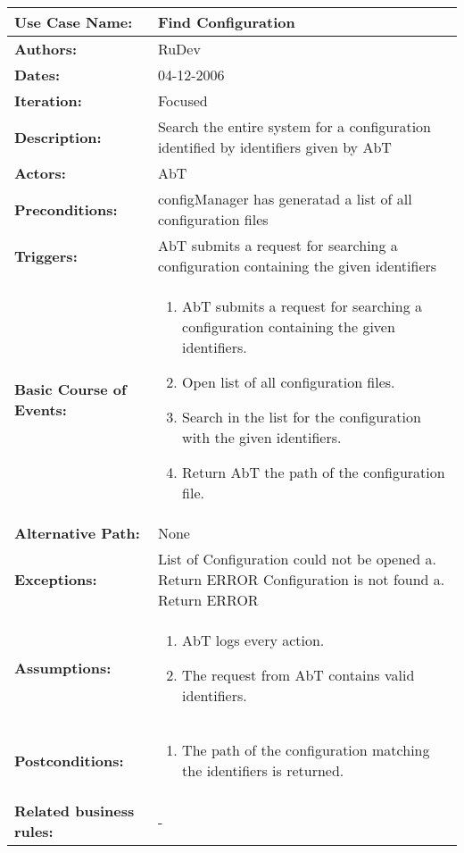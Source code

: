 \begin{tabularx}{\linewidth}{|l|X|}
\hline
\textbf{Use Case Name:} & \textbf{Find Configuration} \\
\hline
\textbf{Authors:} & RuDev \\
\hline
\textbf{Dates:} & 04-12-2006 \\
\hline
\textbf{Iteration:} & Focused \\
\hline
\textbf{Description:} & Search the entire system for a configuration identified by identifiers given by AbT \\
\hline
\textbf{Actors:} & AbT \\
\hline
\textbf{Preconditions:} & configManager has generatad a list of all configuration files \\
\hline
\textbf{Triggers:} & AbT submits a request for searching a configuration containing the given identifiers \\
\hline
\textbf{Basic Course of Events:} & 
\begin{minipage}{\linewidth} 
  \vspace{0.05em}
  \begin{enumerate}
   \item AbT submits a request for searching a configuration containing the given identifiers.
   \item Open list of all configuration files.
   \item Search in the list for the configuration with the given identifiers.
   \item Return AbT the path of the configuration file.
  \end{enumerate}
  \vspace{0.05em}
\end{minipage}
\\
\hline 
\textbf{Alternative Path:} & None \\
\hline
\textbf{Exceptions:} & List of Configuration could not be opened \newline a. Return ERROR \newline\newline Configuration is not found \newline a. Return ERROR \\
\hline
\textbf{Assumptions:} & \begin{enumerate}
							\item AbT logs every action.
							\item The request from AbT contains valid identifiers.
						\end{enumerate} \\
\hline
\textbf{Postconditions:} & 
  \begin{minipage}{\linewidth}
  \vspace{0.05em}
  \begin{enumerate}
    \item The path of the configuration matching the identifiers is returned.
  \end{enumerate}
  \vspace{0.05em}
\end{minipage}
\\
\hline
\textbf{Related business rules:} & - \\
\hline
\end{tabularx}


